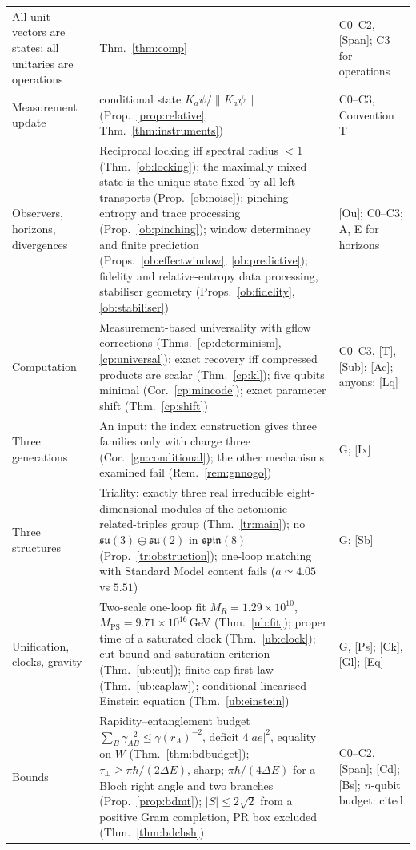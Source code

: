 \documentclass[aps,pra,onecolumn,superscriptaddress,nofootinbib,10pt]{revtex4-2}
\theoremstyle{definition}
\theoremstyle{remark}
\begin{document}
\begin{table}[h]
\begin{tabular}{@{}p{}p{}p{}@{}}
All unit vectors are states; all unitaries are operations & Thm.~\ref{thm:comp} & C0--C2, [Span]; C3 for operations\\
Measurement update & conditional state $K_a\psi/\lVert K_a\psi\rVert$ (Prop.~\ref{prop:relative}, Thm.~\ref{thm:instruments}) & C0--C3, Convention T\\
Observers, horizons, divergences & Reciprocal locking iff spectral radius $<1$ (Thm.~\ref{ob:locking}); the maximally mixed state is the unique state fixed by all left transports (Prop.~\ref{ob:noise}); pinching entropy and trace processing (Prop.~\ref{ob:pinching}); window determinacy and finite prediction (Props.~\ref{ob:effectwindow}, \ref{ob:predictive}); fidelity and relative-entropy data processing, stabiliser geometry (Props.~\ref{ob:fidelity}, \ref{ob:stabiliser}) & [Ou]; C0--C3; A, E for horizons\\
Computation & Measurement-based universality with gflow corrections (Thms.~\ref{cp:determinism}, \ref{cp:universal}); exact recovery iff compressed products are scalar (Thm.~\ref{cp:kl}); five qubits minimal (Cor.~\ref{cp:mincode}); exact parameter shift (Thm.~\ref{cp:shift}) & C0--C3, [T], [Sub]; [Ac]; anyons: [Lq]\\
Three generations & An input: the index construction gives three families only with charge three (Cor.~\ref{gn:conditional}); the other mechanisms examined fail (Rem.~\ref{rem:gnnogo}) & G; [Ix]\\
Three structures & Triality: exactly three real irreducible eight-dimensional modules of the octonionic related-triples group (Thm.~\ref{tr:main}); no $\mathfrak{su}(3)\oplus\mathfrak{su}(2)$ in $\mathfrak{spin}(8)$ (Prop.~\ref{tr:obstruction}); one-loop matching with Standard Model content fails ($a\simeq4.05$ vs $5.51$) & G; [Sb]\\
Unification, clocks, gravity & Two-scale one-loop fit $M_R=1.29\times10^{10}$, $M_{\mathrm{PS}}=9.71\times10^{16}$\,GeV (Thm.~\ref{ub:fit}); proper time of a saturated clock (Thm.~\ref{ub:clock}); cut bound and saturation criterion (Thm.~\ref{ub:cut}); finite cap first law (Thm.~\ref{ub:caplaw}); conditional linearised Einstein equation (Thm.~\ref{ub:einstein}) & G, [Ps]; [Ck], [Gl]; [Eq]\\
Bounds & Rapidity--entanglement budget $\sum_B\gamma_{AB}^{-2}\le\gamma(r_A)^{-2}$, deficit $4\lvert ae\rvert^2$, equality on $W$ (Thm.~\ref{thm:bdbudget}); $\tau_\perp\ge\pi\hbar/(2\Delta E)$, sharp; $\pi\hbar/(4\Delta E)$ for a Bloch right angle and two branches (Prop.~\ref{prop:bdmt}); $\lvert S\rvert\le2\sqrt2$ from a positive Gram completion, PR box excluded (Thm.~\ref{thm:bdchsh}) & C0--C2, [Span]; [Cd]; [Bs]; $n$-qubit budget: cited\\

\end{tabular}
\end{table}
\end{document}
